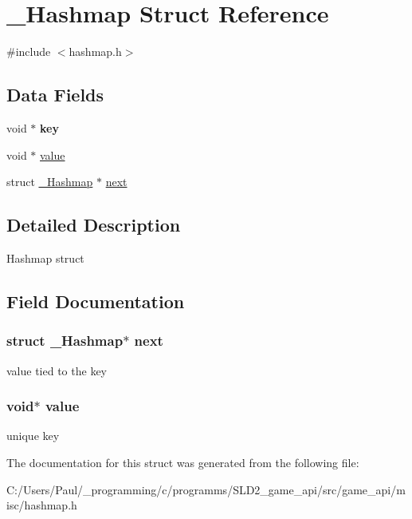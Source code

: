 \hypertarget{struct___hashmap}{\section{\+\_\+\+Hashmap Struct Reference}
\label{struct___hashmap}
}


{\ttfamily \#include $<$hashmap.\+h$>$}

\subsection*{Data Fields}
\begin{DoxyCompactItemize}
\item 
\hypertarget{struct___hashmap_ab5c000aec752f2206131e183daf5efbf}{void $\ast$ {\bfseries key}}\label{struct___hashmap_ab5c000aec752f2206131e183daf5efbf}

\item 
void $\ast$ \hyperlink{struct___hashmap_a0f61d63b009d0880a89c843bd50d8d76}{value}
\item 
struct \hyperlink{struct___hashmap}{\+\_\+\+Hashmap} $\ast$ \hyperlink{struct___hashmap_afe8643b19e0dfa0caf6f55b466b0263f}{next}
\end{DoxyCompactItemize}


\subsection{Detailed Description}
Hashmap struct 

\subsection{Field Documentation}
\hypertarget{struct___hashmap_afe8643b19e0dfa0caf6f55b466b0263f}{
\subsubsection[{next}]{\setlength{\rightskip}{0pt plus 5cm}struct {\bf \+\_\+\+Hashmap}$\ast$ next}}\label{struct___hashmap_afe8643b19e0dfa0caf6f55b466b0263f}
value tied to the key \hypertarget{struct___hashmap_a0f61d63b009d0880a89c843bd50d8d76}{
\subsubsection[{value}]{\setlength{\rightskip}{0pt plus 5cm}void$\ast$ value}}\label{struct___hashmap_a0f61d63b009d0880a89c843bd50d8d76}
unique key 

The documentation for this struct was generated from the following file\+:\begin{DoxyCompactItemize}
\item 
C\+:/\+Users/\+Paul/\+\_\+programming/c/programms/\+S\+L\+D2\+\_\+game\+\_\+api/src/game\+\_\+api/misc/hashmap.\+h\end{DoxyCompactItemize}
